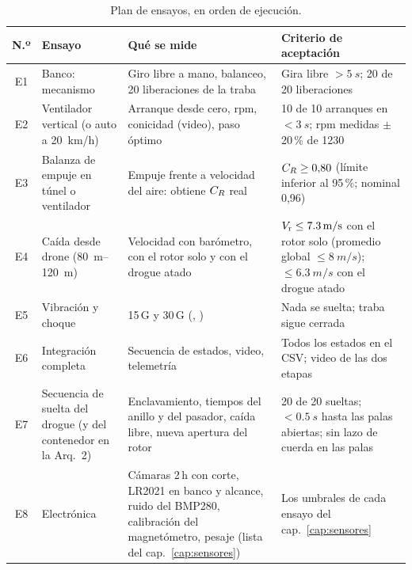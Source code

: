 \begin{table}[H]
\centering\small
\caption{Plan de ensayos, en orden de ejecución.}\label{tab:ensayos}
\begin{tabularx}{\textwidth}{@{}clYY@{}}
\toprule
\textbf{N.º} & \textbf{Ensayo} & \textbf{Qué se mide} & \textbf{Criterio de aceptación}\\\midrule
E1 & Banco: mecanismo & Giro libre a mano, balanceo, 20 liberaciones de la traba & Gira libre $>\SI{5}{s}$; 20 de 20 liberaciones\\
E2 & Ventilador vertical (o auto a \SI{20}{km/h}) & Arranque desde cero, rpm, conicidad (video), paso óptimo & 10 de 10 arranques en $<\SI{3}{s}$; rpm medidas $\pm$20\,\% de 1230\\
E3 & Balanza de empuje en túnel o ventilador & Empuje frente a velocidad del aire: obtiene $C_{R}$ real & $C_{R}\ge0{,}80$ (límite inferior al 95\,\%; nominal 0,96)\\
E4 & Caída desde drone (\SIrange{80}{120}{m}) & Velocidad con barómetro, con el rotor solo y con el drogue atado & $V_{\mathrm{r}}\le\SI{7.3}{m/s}$ con el rotor solo (promedio global $\le\SI{8}{m/s}$); $\le\SI{6.3}{m/s}$ con el drogue atado\\
E5 & Vibración y choque & 15\,G y 30\,G (, ) & Nada se suelta; traba sigue cerrada\\
E6 & Integración completa & Secuencia de estados, video, telemetría & Todos los estados en el CSV; video de las dos etapas\\
E7 & Secuencia de suelta del drogue (y del contenedor en la Arq.~2) & Enclavamiento, tiempos del anillo y del pasador, caída libre, nueva apertura del rotor & 20 de 20 sueltas; $<\SI{0.5}{s}$ hasta las palas abiertas; sin lazo de cuerda en las palas\\
E8 & Electrónica & Cámaras 2\,h con corte, LR2021 en banco y alcance, ruido del BMP280, calibración del magnetómetro, pesaje (lista del cap.~\ref{cap:sensores}) & Los umbrales de cada ensayo del cap.~\ref{cap:sensores}\\
\bottomrule
\end{tabularx}
\end{table}

